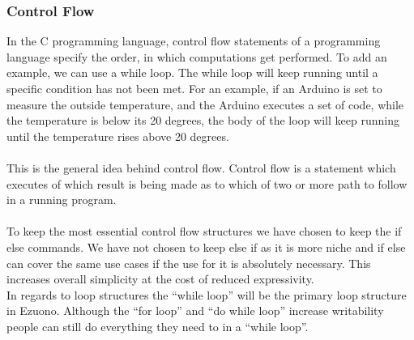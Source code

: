 \subsubsection*{Control Flow}
In the C programming language, control flow statements of a programming language specify the order, in which computations get performed. To add an example, we can use a while loop. The while loop will keep running until a specific condition has not been met. For an example, if an Arduino is set to measure the outside temperature, and the Arduino executes a set of code, while the temperature is below its 20 degrees, the body of the loop will keep running until the temperature rises above 20 degrees. \\
\\
This is the general idea behind control flow. Control flow is a statement which executes of which result is being made as to which of two or more path to follow in a running program. \\
\\
To keep the most essential control flow structures we have chosen to keep the if else commands. We have not chosen to keep else if as it is more niche and if else can cover the same use cases if the use for it is absolutely necessary. This increases overall simplicity at the cost of reduced expressivity.
\\
In regards to loop structures the “while loop” will be the primary loop structure in Ezuono. Although the “for loop” and “do while loop” increase writability people can still do everything they need to in a “while loop”.
